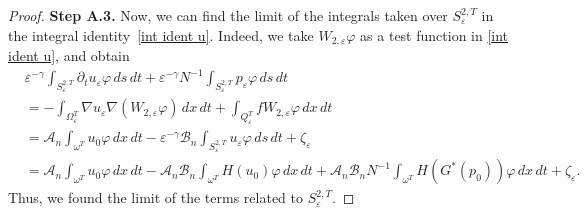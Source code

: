 \documentclass[reqno]{amsart}
\begin{document}
\begin{proof}
\noindent\textbf{Step A.3.}
Now, we can find the limit of the integrals taken over $S_{\varepsilon }^{2,T}$ 
in the integral identity~\eqref{int ident u}.
Indeed, we take $W_{2,\varepsilon }\varphi $ as a test function in 
\eqref{int ident u}, and obtain
\begin{equation}
\begin{aligned}
&\varepsilon ^{-\gamma }\int _{S_{\varepsilon }^{2,T}}\partial
_{t}u_{\varepsilon }\varphi \,ds\,dt+\varepsilon ^{-\gamma }N^{-1}\int
_{S_{\varepsilon }^{2,T}}p_{\varepsilon }\varphi \,ds\,dt \\
&=-\int_{\Omega _{\varepsilon }^{T}}\nabla u_{\varepsilon }\nabla
(W_{2,\varepsilon }\varphi )\,dx\,dt+\int _{Q_{\varepsilon
}^{T}}fW_{2,\varepsilon }\varphi \,dx\,dt    \\
&=\mathcal{A}_n\int _{\omega ^{T}}u_0\varphi \,dx\,dt-\varepsilon
^{-\gamma }\mathcal{B}_n\int _{S_{\varepsilon
}^{2,T}}u_{\varepsilon }\varphi \,ds\,dt+\zeta _{\varepsilon }    \\
&=\mathcal{A}_n\int _{\omega ^{T}}u_0\varphi \,dx\,dt-\mathcal{A}_n%
\mathcal{B}_n\int _{\omega ^{T}}H(u_0)\varphi \,dx\,dt+\mathcal{A}%
_n\mathcal{B}_nN^{-1}\int _{\omega ^{T}}H(G^{\ast
}(p_0))\varphi \,dx\,dt+\zeta _{\varepsilon }.
\end{aligned}  \label{pa_t u conv control}
\end{equation}
Thus, we found the limit of the terms related to $S_{\varepsilon }^{2,T}$.
\smallskip


\end{proof}
\end{document}
